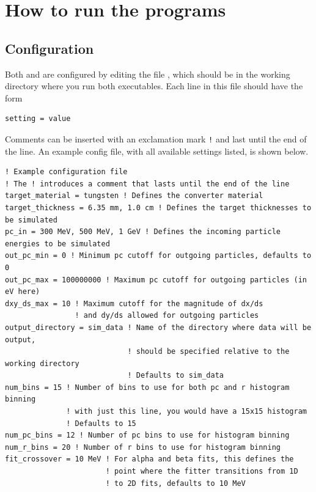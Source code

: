 \documentclass[12pt]{article}
\begin{document}
\section{How to run the programs}

\subsection{Configuration}
Both \exes  and \exef  are configured by editing the file \configfile, which should be in the working directory where you run both executables.
Each line in this file should have the form
\begin{verbatim}
setting = value
\end{verbatim}
Comments can be inserted with an exclamation mark \texttt{!} and last until the end of the line.
An example config file, with all available settings listed, is shown below.
\begin{verbatim}
! Example configuration file
! The ! introduces a comment that lasts until the end of the line
target_material = tungsten ! Defines the converter material
target_thickness = 6.35 mm, 1.0 cm ! Defines the target thicknesses to be simulated
pc_in = 300 MeV, 500 MeV, 1 GeV ! Defines the incoming particle energies to be simulated
out_pc_min = 0 ! Minimum pc cutoff for outgoing particles, defaults to 0
out_pc_max = 100000000 ! Maximum pc cutoff for outgoing particles (in eV here)
dxy_ds_max = 10 ! Maximum cutoff for the magnitude of dx/ds
                ! and dy/ds allowed for outgoing particles
output_directory = sim_data ! Name of the directory where data will be output,
                            ! should be specified relative to the working directory
                            ! Defaults to sim_data
num_bins = 15 ! Number of bins to use for both pc and r histogram binning
              ! with just this line, you would have a 15x15 histogram
              ! Defaults to 15
num_pc_bins = 12 ! Number of pc bins to use for histogram binning
num_r_bins = 20 ! Number of r bins to use for histogram binning
fit_crossover = 10 MeV ! For alpha and beta fits, this defines the
                       ! point where the fitter transitions from 1D
                       ! to 2D fits, defaults to 10 MeV
\end{verbatim}
\newcommand{\targetm}{\texttt{target\_material}\xspace}
\newcommand{\targett}{\texttt{target\_thickness}\xspace}
\newcommand{\pcin}{\texttt{pc\_in}\xspace}
\newcommand{\outpcmin}{\texttt{out\_pc\_min}\xspace}
\newcommand{\outpcmax}{\texttt{out\_pc\_max}\xspace}
\newcommand{\dxydsmax}{\texttt{dxy\_ds\_max}\xspace}
\newcommand{\outdir}{\texttt{output\_directory}\xspace}
\newcommand{\numbins}{\texttt{num\_bins}\xspace}
\newcommand{\numrbins}{\texttt{num\_r\_bins}\xspace}
\newcommand{\numpcbins}{\texttt{num\_pc\_bins}\xspace}
\newcommand{\fitxpt}{\texttt{fit\_crossover}\xspace}
\end{document}
